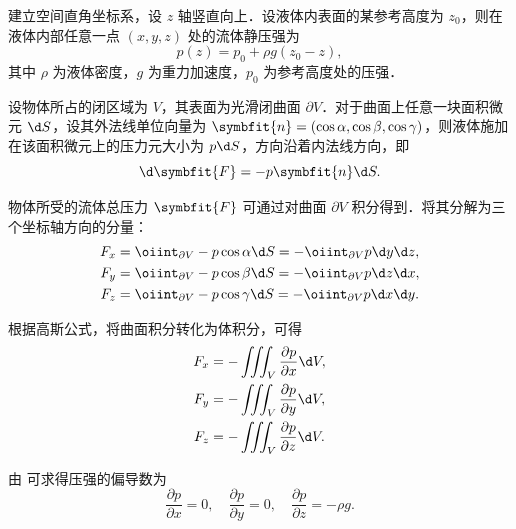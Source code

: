 \begin{myproof}
    建立空间直角坐标系，设 $z$ 轴竖直向上．设液体内表面的某参考高度为 $z_0$，则在液体内部任意一点 $(x, y, z)$ 处的流体静压强为
    \begin{equation}
        \label{eq:pressure}
        p(z) = p_0 + \rho g (z_0 - z),
    \end{equation}
    其中 $\rho$ 为液体密度，$g$ 为重力加速度，$p_0$ 为参考高度处的压强．

    设物体所占的闭区域为 $V$，其表面为光滑闭曲面 $\partial V$．对于曲面上任意一块面积微元 $\d S$，设其外法线单位向量为 $\symbfit{n} = (\cos \alpha, \cos \beta, \cos \gamma)$，则液体施加在该面积微元上的压力元大小为 $p \d S$，方向沿着内法线方向，即
    \begin{equation}
        \label{eq:force-element}
        \d\symbfit{F} = -p \symbfit{n} \d S.
    \end{equation}

    物体所受的流体总压力 $\symbfit{F}$ 可通过对曲面 $\partial V$ 积分得到．将其分解为三个坐标轴方向的分量：
    \begin{equation}
        \label{eq:force-components}
        \begin{aligned}
            F_x & = \oiint_{\partial V} -p \cos \alpha \d S = -\oiint_{\partial V} p \d y \d z, \\
            F_y & = \oiint_{\partial V} -p \cos \beta \d S = -\oiint_{\partial V} p \d z \d x,  \\
            F_z & = \oiint_{\partial V} -p \cos \gamma \d S = -\oiint_{\partial V} p \d x \d y.
        \end{aligned}
    \end{equation}

    根据高斯公式，将曲面积分转化为体积分，可得
    \begin{equation}
        \label{eq:gauss-app-2}
        \begin{aligned}
            F_x & = -\iiint_V \frac{\partial p}{\partial x} \d V, \\
            F_y & = -\iiint_V \frac{\partial p}{\partial y} \d V, \\
            F_z & = -\iiint_V \frac{\partial p}{\partial z} \d V.
        \end{aligned}
    \end{equation}

    由  可求得压强的偏导数为
    \begin{equation}
        \label{eq:pressure-derivatives}
        \frac{\partial p}{\partial x} = 0, \quad \frac{\partial p}{\partial y} = 0, \quad \frac{\partial p}{\partial z} = -\rho g.
    \end{equation}


\end{myproof}
